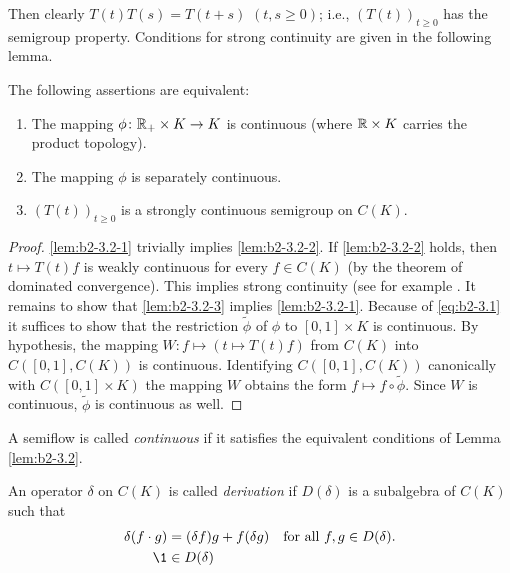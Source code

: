 Then clearly $T(t)T(s) = T(t+s)$ $(t,s\geq 0)$; i.e., $(T(t))_{t \geq 0}$ has the
semigroup property.
Conditions for strong continuity are given in the following lemma.

\begin{lemma}\label{lem:b2-3.2}
The following assertions are equivalent:
\begin{enumerate}[\upshape (a)]
\item \label{lem:b2-3.2-1}
The mapping $\phi \colon \mathbb{R}_{+} \times K \to K$ is continuous (where $\mathbb{R} \times K$ carries the product topology).
\item \label{lem:b2-3.2-2}
The mapping $\phi$ is separately continuous.
\item \label{lem:b2-3.2-3}
$(T(t))_{t \geq 0}$ is a strongly continuous semigroup on $C(K)$.
\end{enumerate}
\end{lemma}

\begin{proof}
\ref{lem:b2-3.2-1} trivially implies \ref{lem:b2-3.2-2}.
If \ref{lem:b2-3.2-2} holds, then $t \mapsto T(t)f$ is weakly continuous for every $f \in C(K)$ (by the theorem of dominated convergence).
This implies strong continuity (see for example \citet[Proposition 1.23]{davies:1980}.
It remains to show that \ref{lem:b2-3.2-3} implies \ref{lem:b2-3.2-1}.
Because of \eqref{eq:b2-3.1} it suffices to show that the restriction $\widetilde{\phi}$ of $\phi$ to $[0,1] \times K$ is continuous.
By hypothesis, the mapping $W \colon f \mapsto (t \mapsto T(t)f)$ from $C(K)$ into $C([0,1],C(K))$ is continuous.
Identifying $C([0,1],C(K))$ canonically with $C([0,1] \times K)$ the mapping $W$ obtains the form $f \mapsto f \circ \widetilde{\phi}$.
Since $W$ is continuous, $\widetilde{\phi}$ is continuous as well.
\end{proof}

A semiflow is called \emph{continuous} if it satisfies the equivalent conditions of Lemma \ref{lem:b2-3.2}.

\begin{definition}\label{def:b2-3.3}
An operator $\delta$ on $C(K)$ is called \emph{derivation} if $D(\delta)$ is a subalgebra of $C(K)$ such that
\begin{align}
\delta(f \cdot g) &= (\delta f)g + f(\delta g) \quad \text{for all } f,g \in D(\delta). \label{eq:b2-3.4} \\
\1 &\in D(\delta) \label{eq:b2-3.5}
\end{align}
\end{definition}

